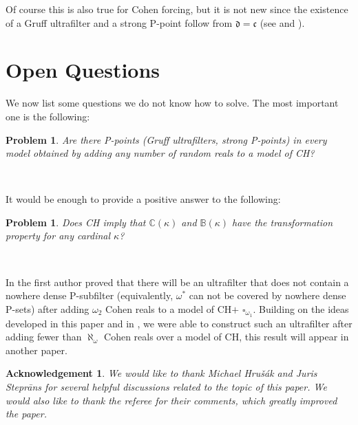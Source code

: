 \documentclass{article}%
\newtheorem{acknowledgement}[theorem]{Acknowledgement}
\newtheorem{problem}[theorem]{Problem}
\begin{document}
Of course this is also true for Cohen forcing, but it is not new since the
existence of a Gruff ultrafilter and a strong \textsf{P}-point follow from
$\mathfrak{d=c}$ (see \cite{GruffUltrafilters} and \cite{CanjarFilters}).

\section{Open Questions}

We now list some questions we do not know how to solve. The most important one
is the following:

\begin{problem}
Are there \textsf{P}-points (Gruff ultrafilters, strong \textsf{P}-points) in
every model obtained by adding any number of random reals to a model of
\textsf{CH}?
\end{problem}

\qquad\ \ \qquad

It would be enough to provide a positive answer to the following:

\begin{problem}
Does \textsf{CH }imply that $\mathbb{C}\left(  \kappa\right)  $ and
$\mathbb{B}\left(  \kappa\right)  $ have the transformation property for any
cardinal $\kappa$?
\end{problem}

\qquad\ \ \qquad\ \ \ 

In \cite{PFiltersCohenRandomLaver} the first author proved that there will be
an ultrafilter that does not contain a nowhere dense \textsf{P}-subfilter
(equivalently, $\omega^{\ast}$ can not be covered by nowhere dense
\textsf{P}-sets) after adding $\omega_{2}$ Cohen reals to a model of
\textsf{CH}$+$ $\square_{\omega_{1}}$. Building on the ideas developed in this
paper and in \cite{PFiltersCohenRandomLaver}, we were able to construct such
an ultrafilter after adding fewer than $\aleph_{\omega}$ Cohen reals over a
model of \textsf{CH, }this result will appear in another paper.

\begin{acknowledgement}
We would like to thank Michael Hru\v{s}\'{a}k and Juris Stepr\={a}ns for
several helpful discussions related to the topic of this paper. We would also
like to thank the referee for their comments, which greatly improved the paper.
\end{acknowledgement}
\end{document}
